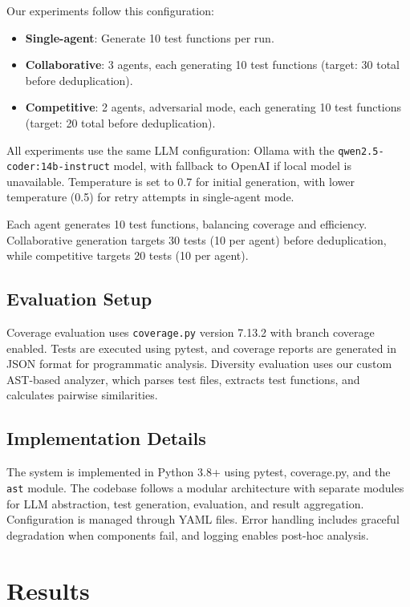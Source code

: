 \documentclass[11pt]{article}
\begin{document}
Our experiments follow this configuration:

\begin{itemize}
\item \textbf{Single-agent}: Generate 10 test functions per run.
\item \textbf{Collaborative}: 3 agents, each generating 10 test functions (target: 30 total before deduplication).
\item \textbf{Competitive}: 2 agents, adversarial mode, each generating 10 test functions (target: 20 total before deduplication).
\end{itemize}

All experiments use the same LLM configuration: Ollama with the \texttt{qwen2.5-coder:14b-instruct} model, with fallback to OpenAI if local model is unavailable. Temperature is set to 0.7 for initial generation, with lower temperature (0.5) for retry attempts in single-agent mode.

Each agent generates 10 test functions, balancing coverage and efficiency. Collaborative generation targets 30 tests (10 per agent) before deduplication, while competitive targets 20 tests (10 per agent).

\subsection{Evaluation Setup}

Coverage evaluation uses \texttt{coverage.py} version 7.13.2 with branch coverage enabled. Tests are executed using pytest, and coverage reports are generated in JSON format for programmatic analysis. Diversity evaluation uses our custom AST-based analyzer, which parses test files, extracts test functions, and calculates pairwise similarities.

\subsection{Implementation Details}

The system is implemented in Python 3.8+ using pytest, coverage.py, and the \texttt{ast} module. The codebase follows a modular architecture with separate modules for LLM abstraction, test generation, evaluation, and result aggregation. Configuration is managed through YAML files. Error handling includes graceful degradation when components fail, and logging enables post-hoc analysis.

\section{Results}
\end{document}
